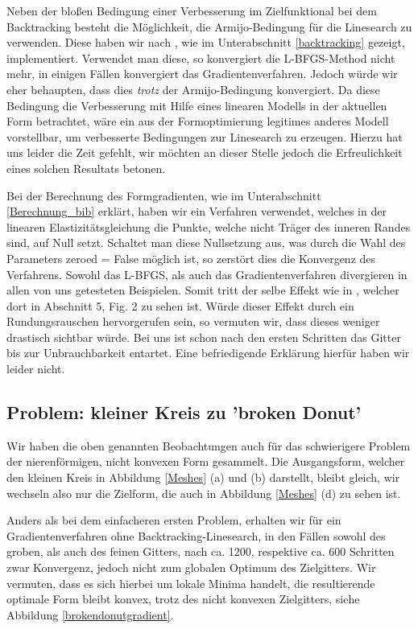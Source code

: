 Neben der bloßen Bedingung einer Verbesserung im Zielfunktional bei dem Backtracking besteht die Möglichkeit, die Armijo-Bedingung für die Linesearch zu verwenden. Diese haben wir nach \cite{Nocedal}, wie im Unterabschnitt  \ref{backtracking} gezeigt,  implementiert. Verwendet man diese, so konvergiert die L-BFGS-Method nicht mehr, in einigen Fällen konvergiert das Gradientenverfahren. Jedoch würde wir eher behaupten, dass dies \textit{trotz} der Armijo-Bedingung konvergiert. Da diese Bedingung die Verbesserung mit Hilfe eines linearen Modells in der aktuellen Form betrachtet, wäre ein aus der Formoptimierung legitimes anderes Modell vorstellbar, um verbesserte Bedingungen zur Linesearch zu erzeugen. Hierzu hat uns leider die Zeit gefehlt, wir möchten an dieser Stelle jedoch die Erfreulichkeit eines solchen Resultats betonen. 

Bei der Berechnung des Formgradienten, wie im Unterabschnitt \ref{Berechnung_bib} erklärt, haben wir ein Verfahren verwendet, welches in der linearen Elastizitätsgleichung die Punkte, welche nicht Träger des inneren Randes sind, auf Null setzt. Schaltet man diese Nullsetzung aus, was durch die Wahl des Parameters \textsf{zeroed = False} möglich ist, so zerstört dies die Konvergenz des Verfahrens. Sowohl das L-BFGS, als auch das Gradientenverfahren divergieren in allen von uns getesteten Beispielen. Somit tritt der selbe Effekt wie in \cite{bfgs2}, welcher dort in Abschnitt 5, Fig. 2 zu sehen ist. Würde dieser Effekt durch ein Rundungsrauschen hervorgerufen sein, so vermuten wir, dass dieses weniger drastisch sichtbar würde. Bei uns ist schon nach den ersten Schritten das Gitter bis zur Unbrauchbarkeit entartet. Eine befriedigende Erklärung hierfür haben wir leider nicht.

\subsection{Problem: kleiner Kreis zu 'broken Donut'}\label{subsect_donut}

Wir haben die oben genannten Beobachtungen auch für das schwierigere Problem der nierenförmigen, nicht konvexen Form gesammelt. Die Ausgangsform, welcher den kleinen Kreis in Abbildung \ref{Meshes} (a) und (b) darstellt, bleibt gleich, wir wechseln also nur die Zielform, die auch in Abbildung \ref{Meshes} (d) zu sehen ist. 

Anders als bei dem einfacheren ersten Problem, erhalten wir für ein Gradientenverfahren ohne Backtracking-Linesearch, in den Fällen sowohl des groben, als auch des feinen Gitters, nach ca. 1200, respektive ca. 600 Schritten zwar Konvergenz, jedoch nicht zum globalen Optimum des Zielgitters. Wir vermuten, dass es sich hierbei um lokale Minima handelt, die resultierende optimale Form bleibt konvex, trotz des nicht konvexen Zielgitters, siehe Abbildung
\ref{brokendonutgradient}.

